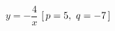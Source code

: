 \hspace*{2mm}\begin{minipage}[t]{\dimexpr\linewidth-2mm\relax}\vspace{0pt}
$y=-\dfrac{4}{x}$ \quad $[\mkern3mu p=5,\ q=-7\mkern3mu ]$\end{minipage}
